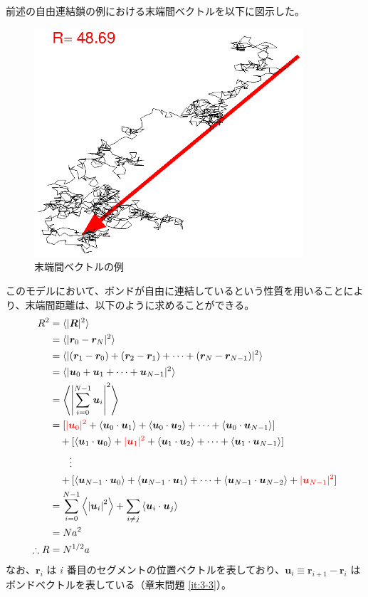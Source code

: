 \documentclass[uplatex,dvipdfmx,a4paper,11pt, titlepage]{jsarticle}
\begin{document}
前述の自由連結鎖の例における末端間ベクトルを以下に図示した。
\begin{figure}[htb]
	\begin{center}
		\includegraphics[width=10cm]{figure/RF_EV.eps}
		\caption{末端間ベクトルの例}
		\label{fig: RF_EV}
	\end{center}
\end{figure}

このモデルにおいて、ボンドが自由に連結しているという性質を用いることにより、末端間距離は、以下のように求めることができる。
\begin{align}
R^2
	&= \langle |\bm{R}|^2 \rangle \notag \\
	&=\langle |\bm{r}_0 - \bm{r}_N|^2 \rangle \notag \\
	&=\langle |(\bm{r}_1 - \bm{r}_0) + (\bm{r}_2 - \bm{r}_1) + \cdots + (\bm{r}_N - \bm{r}_{N-1})|^2 \rangle \notag \\
	&=\langle |\bm{u}_0 + \bm{u}_1 + \cdots + \bm{u}_{N-1}|^2 \rangle \notag \\
	&=\left\langle \left|\sum_{i=0}^{N-1}\bm{u}_i \right|^2 \right\rangle \notag \\
	&= 
		[ 
		{\color{red} |\bm{u}_0|^2} + \langle \bm{u}_0 \cdot \bm{u}_1 \rangle + \langle \bm{u}_0 \cdot \bm{u}_2 \rangle + \cdots + \langle \bm{u}_0 \cdot \bm{u}_{N-1} \rangle 
		] \notag \\
	&\quad+ 
		[ 
		\langle \bm{u}_1 \cdot \bm{u}_0 \rangle + {\color{red} |\bm{u}_1|^2} + \langle \bm{u}_1 \cdot \bm{u}_2 \rangle + \cdots + \langle \bm{u}_1 \cdot \bm{u}_{N-1} \rangle 
		] \notag \\
	&\quad\quad \vdots \notag \\
	&\quad+ 
		[ 
		\langle \bm{u}_{N-1} \cdot \bm{u}_0 \rangle + \langle \bm{u}_{N-1} \cdot \bm{u}_1 \rangle + \cdots + \langle \bm{u}_{N-1} \cdot \bm{u}_{N-2} \rangle + {\color{red} |\bm{u}_{N-1}|^2} 
		] \notag \\
	&=\sum_{i=0}^{N-1} \left\langle \left|\bm{u}_i \right|^2 \right\rangle 
	+\sum_{i \neq j} \left\langle \bm{u}_i \cdot \bm{u}_j \right\rangle \notag \\
	&= N a^2 \notag \\
\therefore R &= N^{1/2}a
\label{eq:r2}
\end{align}
なお、$\bm{r}_i$ は $i$ 番目のセグメントの位置ベクトルを表しており、$\bm{u}_i \equiv \bm{r}_{i+1} - \bm{r}_i$ はボンドベクトルを表している（章末問題 \ref{it:3-3}）。
\end{document}
